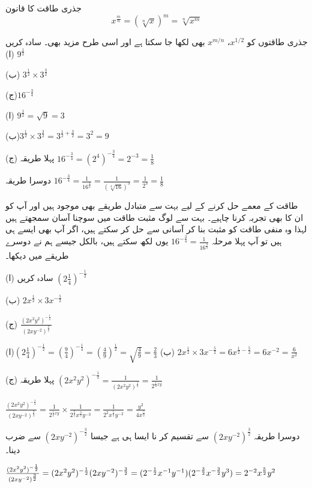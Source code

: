 جذری طاقت کا قانون 
\[x^{\frac{m}{n}}=(\sqrt[n]{x})^{m}=\sqrt[n]{x^{m}}\]

جذری طاقتوں کو \(x^{1/2}\)، \(x^{m/n}\) بھی لکھا جا سکتا ہے اور اسی طرح مزید بھی۔
سادہ کریں
(ا) \(9^{\frac{1}{2}}\)

(ب)
\(3^{\frac{1}{2}}\times 3^{\frac{3}{2}}\)

(ج)\(16^{-\frac{3}{4}}\)

(ا)
\(9^{\frac{1}{2}}=\sqrt{9}=3\)

(ب)\(3^{\frac{1}{2}}\times 3^{\frac{3}{2}}=3^{\frac{1}{2}+\frac{3}{2}}=3^{2}=9\)

(ج) پہلا طریقہ \(16^{-\frac{3}{4}}=(2^{4})^{-\frac{3}{4}}=2^{-3}=\frac{1}{8}\)

دوسرا طریقہ 
\(16^{-\frac{3}{4}}=\frac{1}{16^{\frac{3}{4}}}=\frac{1}{(\sqrt[4]{16})^{3}}=\frac{1}{2^{3}}=\frac{1}{8}\)

طاقت کے معمے حل کرنے کے لیے بہت سے متبادل طریقے بھی موجود ہیں اور آپ کو ان کا بھی تجربہ کرنا چاہیے۔ بہت سے لوگ مثبت طاقت میں سوچنا آسان سمجھتے ہیں لہذا وہ منفی طاقت کو مثبت بنا کر آسانی سے حل کر سکتے ہیں، اگر آپ بھی ایسے ہی ہیں تو آپ پہلا مرحلہ  \(16^{-\frac{3}{4}}=\frac{1}{16^{\frac{3}{4}}}\) یوں لکھ سکتے ہیں، بالکل جیسے ہم نے دوسرے طریقے میں دیکھا۔

سادہ کریں
(ا) \((2\frac{1}{4})^{-\frac{1}{2}}\)

(ب)
\(2x^{\frac{1}{2}}\times 3x^{-\frac{5}{2}}\)

(ج) 
\(\frac{(2x^{2}y^{2})^{-\frac{1}{2}}}{(2xy^{-2})^{\frac{3}{2}}}\)

(ا)\((2\frac{1}{4})^{-\frac{1}{2}}=(\frac{9}{4})^{-\frac{1}{4}}=(\frac{4}{9})^{\frac{1}{2}}=\sqrt{\frac{4}{9}}=\frac{2}{3}\)
(ب)
\(2x^{\frac{1}{2}}\times 3x^{-\frac{5}{2}}=6x^{\frac{1}{2}-\frac{5}{2}}=6x^{-2}=\frac{6}{x^{2}}\)

(ج)  پہلا طریقہ
\((2x^{2}y^{2})^{-\frac{1}{2}}=\frac{1}{(2x^{2}y^{2})^{\frac{1}{2}}}=\frac{1}{2^{\frac{1}{2}xy}}\)

\(\frac{(2x^{2}y^{2})^{-\frac{1}{2}}}{(2xy^{-2})^{\frac{3}{2}}}=\frac{1}{2^{\frac{1}{2}xy}}\times \frac{1}{2^{\frac{3}{2}}x^{\frac{3}{2}}y^{-3}}= \frac{1}{2^{2}x^{\frac{5}{2}}y^{-2}}=\frac{y^{2}}{4x^{\frac{5}{2}}}\)

دوسرا طریقہ \((2xy^{-2})^{\frac{3}{2}}\) سے تقسیم کر نا ایسا ہی ہے جیسا \((2xy^{-2})^{-\frac{3}{2}}\) سے ضرب دینا۔

\(\frac{(2x^{2}y^{2})^{-\frac{1}{2}}}{(2xy^{-2})^{\frac{3}{2}}}=(2x^{2}y^{2})^{-\frac{1}{2}}(2xy^{-2})^{-\frac{3}{2}}=(2^{-\frac{1}{2}}x^{-1}y^{-1})(2^{-\frac{3}{2}}x^{-\frac{3}{2}}y^{3})=2^{-2}x^{\-\frac{5}{2}}y^{2}\)

